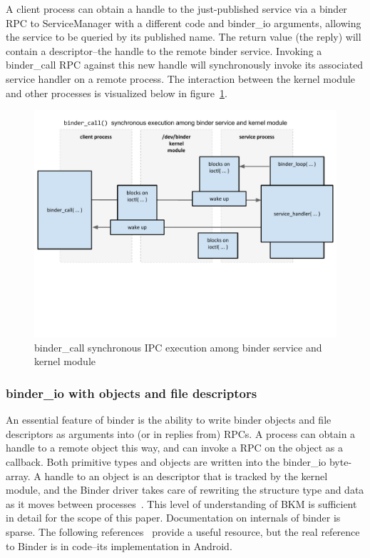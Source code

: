 \documentclass[prodmode]{acmlarge}
\begin{document}
A client process can obtain a handle to the just-published service via a binder RPC to ServiceManager with a different code and binder\_io arguments, allowing the service to be queried by its published name. The return value (the reply) will contain a descriptor--the handle to the remote binder service. Invoking a binder\_call RPC against this new handle will synchronously invoke its associated service handler on a remote process. The interaction between the kernel module and other processes is visualized below in figure~\ref{fig:binder_call}.
\begin{figure}[h]
\centering
\includegraphics[width=\textwidth]{drawings/binder_call.pdf}
\caption{binder\_call synchronous IPC execution among binder service and kernel module}
\label{fig:binder_call}
\end{figure}

\subsubsection{binder\_io with objects and file descriptors}
An essential feature of binder is the ability to write binder objects and file descriptors as arguments into (or in replies from) RPCs. A process can obtain a handle to a remote object this way, and can invoke a RPC on the object as a callback. Both primitive types and objects are written into the binder\_io byte-array. A handle to an object is an descriptor that is tracked by the kernel module, and the Binder driver takes care of rewriting the structure type and data as it moves between processes~\cite{BinderSourceComment}. This level of understanding of BKM is sufficient in detail for the scope of this paper. Documentation on internals of binder is sparse. The following references~\cite{BinderLinuxFoundation,BinderMastersThesis} provide a useful resource, but the real reference to Binder is in code--its implementation in Android.
\end{document}
